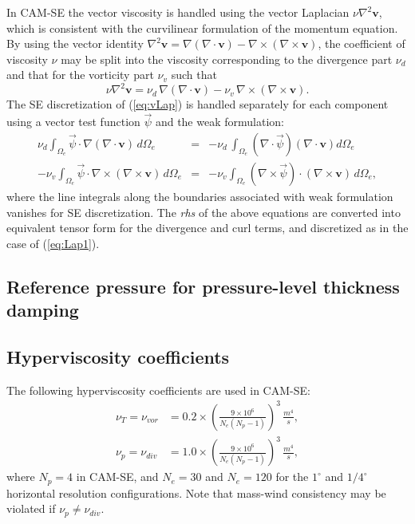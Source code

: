 \documentclass{agujournal}
\begin{document}
{ In CAM-SE the vector viscosity is handled  using the vector Laplacian $\nu \nabla^2 \mathbf{v}$, 
 which is consistent with the curvilinear formulation of the momentum equation.  By using the vector identity 
 $\nabla^2 \mathbf{v} = \nabla(\nabla \cdot \mathbf{v}) - \nabla \times (\nabla \times \mathbf{v}) $, 
 the coefficient of viscosity $\nu$ may be split into the viscosity corresponding to the divergence part $\nu_d$
 and that for  the vorticity part $\nu_v$ such that 
 \begin{equation}
  \nu \nabla^2 \mathbf{v} = \nu_d \, \nabla(\nabla \cdot \mathbf{v}) -
   \nu_v \,  \nabla \times (\nabla \times \mathbf{v}). \label{eq:vLap}
 \end{equation}
   The SE discretization  of (\ref{eq:vLap}) is handled separately for each component using a vector test function
   $\vec{ \psi}$ and the weak formulation: 
   \begin{eqnarray}
       \nu_d  \int_{\Omega_e} \vec{\psi} \cdot   \nabla(\nabla \cdot \mathbf{v})  \,    d \Omega_e  & = & 
       -  \nu_d \, \int_{\Omega_e} (\nabla \cdot \vec{\psi})   (\nabla \cdot \mathbf{v})   d \Omega_e \\
         -   \nu_v  \int_{\Omega_e}     \vec{\psi} \cdot  \nabla \times (\nabla \times \mathbf{v})   \,    d \Omega_e  & = &
                          -   \nu_v  \int_{\Omega_e} (\nabla \times      \vec{\psi} ) \cdot (\nabla \times \mathbf{v})    \,     d \Omega_e ,  
   \end{eqnarray}
   where the line integrals along the boundaries associated with weak formulation  vanishes for SE discretization. 
   The {\em rhs} of the above equations are converted into equivalent tensor form  for the divergence and curl terms,
   and discretized as in the case of (\ref{eq:Lap1}). 
   
\subsection{Reference pressure for pressure-level thickness damping}\label{app:ref_dp}
{\color{red}{Patrick}}

 
\subsection{Hyperviscosity coefficients}\label{app:nu}
The following hyperviscosity coefficients are used in CAM-SE:
\begin{align}
\nu_T = \nu_{vor} &= 0.2\times \left(\frac{9\times 10^6}{N_e (N_p-1)}\right)^3\, \frac{m^4}{s},\\
\nu_p = \nu_{div} &= 1.0\times \left(\frac{9\times 10^6}{N_e (N_p-1)}\right)^3\, \frac{m^4}{s},
\end{align}
where $N_p=4$ in CAM-SE, and $N_e=30$ and $N_e=120$ for the $1^\circ$ and $1/4^{\circ}$ horizontal resolution configurations. Note that mass-wind consistency may be violated if $\nu_p \neq \nu_{div}$.

}
\end{document}
